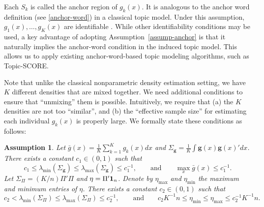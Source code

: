 \documentclass[preprint,11pt]{article}
\newtheorem{assumption}{Assumption}
\numberwithin{equation}{section}
\begin{document}
Each $S_k$ is called the anchor region of $g_k(x)$. It is analogous to the anchor word definition (see \eqref{anchor-word}) in a classical topic model. 
Under this assumption, $g_1(x), \ldots, g_K(x)$ are identifiable \citep{austern2025poisson}. 
%
While other identifiability conditions may be used, a key advantage of adopting Assumption~\ref{assump-anchor} is that it naturally implies the anchor-word condition in the induced topic model. This allows us to apply existing anchor-word-based topic modeling algorithms, such as Topic-SCORE.


Note that unlike the classical nonparametric density estimation setting, we have $K$ different densities that are mixed together. We need additional conditions to ensure that ``unmixing'' them is possible. 
Intuitively, we require that (a) the $K$ densities are not too ``similar'', and (b) the ``effective sample size'' for estimating each individual $g_k(x)$ is properly large.  
We formally state these conditions as follows:


\begin{assumption} \label{assump2}
Let $\bar{g}(x)=\frac{1}{K}\sum_{k=1}^K g_k(x)dx$ and $\Sigma_{\boldsymbol g} = \frac{1}{K}\int {\boldsymbol g}(x) {\boldsymbol g}(x)' dx$. There exists a constant $c_1\in (0,1)$ such that 
\[
c_1\leq \lambda_{\min}(\Sigma_{\boldsymbol g}) \leq \lambda_{\max}(\Sigma_{\boldsymbol g})\leq c_1^{-1}, \qquad\mbox{and}\qquad \max_x \bar{g}(x) \leq c_1^{-1}. 
\]
Let $\Sigma_\Pi = (K/n)\Pi'\Pi$ and $\eta = \Pi'{\bf 1}_n$. Denote by $\eta_{\max}$ and $\eta_{\min}$ the maximum and minimum entries of $\eta$. There exists a constant $c_2\in (0,1)$ such that 
\[
c_2 <\lambda_{\min}(\Sigma_\Pi)\leq \lambda_{\max}(\Sigma_\Pi)\leq c_2^{-1}, \qquad\mbox{and}\qquad c_2K^{-1}n\leq \eta_{\min}\leq \eta_{\max}\leq c^{-1}_2K^{-1}n. 
\]
\end{assumption}
\end{document}
